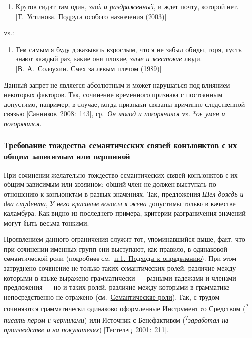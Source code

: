 \begin{enumerate}
  \def\labelenumi{(\arabic{enumi})}
  \setcounter{enumi}{14}
  \item
        Крутов сидит там один, \textit{злой и раздраженный}, и ждет почту,
        которой нет. {[}Т.~Устинова. Подруга особого назначения (2003){]}
\end{enumerate}

vs.:

\begin{enumerate}
  \def\labelenumi{(\arabic{enumi})}
  \setcounter{enumi}{15}
  \item
        Тем самым я буду доказывать взрослым, что я не забыл обиды, горя,
        пусть знают каждый раз, какие они плохие, \textit{злые и жестокие} люди.
        {[}В.~А.~Солоухин. Смех за левым плечом (1989){]}
\end{enumerate}

Данный запрет не является абсолютным и может нарушаться под влиянием
некоторых факторов. Так, сочинение временного признака с постоянным
допустимо, например, в случае, когда признаки связаны
причинно-следственной связью {[}Санников~2008:~143{]}, ср.~\textit{Он
  молод и погорячился} vs. *\textit{он умен и погорячился}.

\subsubsection{Требование тождества семантических связей конъюнктов с их
  общим зависимым или
  вершиной}\label{ux442ux440ux435ux431ux43eux432ux430ux43dux438ux435-ux442ux43eux436ux434ux435ux441ux442ux432ux430-ux441ux435ux43cux430ux43dux442ux438ux447ux435ux441ux43aux438ux445-ux441ux432ux44fux437ux435ux439-ux43aux43eux43dux44aux44eux43dux43aux442ux43eux432-ux441-ux438ux445-ux43eux431ux449ux438ux43c-ux437ux430ux432ux438ux441ux438ux43cux44bux43c-ux438ux43bux438-ux432ux435ux440ux448ux438ux43dux43eux439}

При сочинении желательно тождество семантических связей конъюнктов с их
общим зависимым или хозяином: общий член не должен выступать по
отношению к конъюнктам в разных значениях. Так, предложения \textit{Шел
  дождь и два студента}, \textit{У него красивые волосы и жена} допустимы
только в качестве каламбура. Как видно из последнего примера, критерии
разграничения значений могут быть весьма тонкими.

Проявлением данного ограничения служит тот, упоминавшийся выше, факт,
что при сочинении именных групп они выступают, как правило, в одинаковой
семантической роли (подробнее см.~\underline{п.1.~Подходы к
  определению}). При этом затруднено сочинение не только таких
семантических ролей, различие между которыми в языке выражено
грамматически --- разными падежами и членами предложения --- но и таких
ролей, различие между которыми в грамматике непосредственно не отражено
(см.~\underline{Семантические роли}). Так, с трудом сочиняются
грамматически одинаково оформленные Инструмент со Средством
(\textsuperscript{?}\textit{писать пером и чернилами}) или Источник с
Бенефактивом (\textsuperscript{?}\textit{заработал на производстве и на
  покупателях}) {[}Тестелец~2001:~211{]}.

